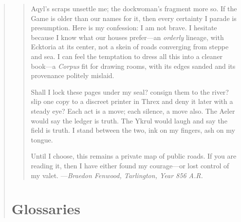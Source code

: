 \documentclass[11pt]{article}
\begin{document}
\begin{quote}
\begin{quote}
Aqyl's scraps unsettle me; the dockwoman's fragment more so. If the Game is older than our names for it, then every certainty I parade is presumption. Here is my confession: I am not brave. I hesitate because I know what our houses prefer---an \emph{orderly} lineage, with Ecktoria at its center, not a skein of roads converging from steppe and sea. I can feel the temptation to dress all this into a cleaner book---a \emph{Corpus} fit for drawing rooms, with its edges sanded and its provenance politely mislaid.

Shall I lock these pages under my seal? consign them to the river? slip one copy to a discreet printer in Threx and deny it later with a steady eye? Each act is a move; each silence, a move also. The Aeler would say the ledger is truth. The Ykrul would laugh and say the field is truth. I stand between the two, ink on my fingers, ash on my tongue.

Until I choose, this remains a private map of public roads. If you are reading it, then I have either found my courage---or lost control of my valet.
\hfill---\textit{Braedon Fenwood, Tarlington, Year 856 A.R.}
\end{quote}

\clearpage

\section{Glossaries}

\end{quote}
\end{document}
